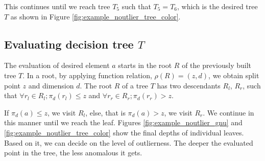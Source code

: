 \begin{example}
\begin{enumerate}
This continues until we reach tree $T_5$ such that $T_5=T_6$, which is the desired tree $T$ as shown in Figure \ref{fig:example_noutlier_tree_color}. 

\end{enumerate}

\end{example}


\subsection{Evaluating decision tree $T$}
The evaluation of desired element $a$ starts in the root $R$ of the previously built tree $T$.
In a root, by applying function relation, $\rho(R) = (z,d)$, we obtain split point $z$ and dimension $d$.
The root $R$ of a tree $T$ has two descendants $R_l$, $R_r$, such that
$\forall r_l\in R_l; \pi_d(r_l) \le z$ and $\forall r_r\in R_r; \pi_d(r_r)  > z$.

If $\pi_d(a)\le z$, we visit $R_l$, else, that is $\pi_d(a) > z$, we visit $R_r$.
We continue in this manner until we reach the leaf. Figures \ref{fig:example_noutlier_gnu} and \ref{fig:example_noutlier_tree_color} show the final depths of individual leaves. Based on it, we can decide on the level of outlierness. The deeper the evaluated point in the tree, the less anomalous it gets.

